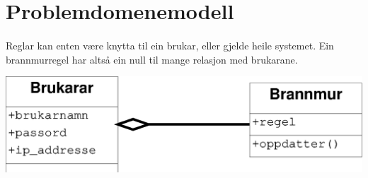 \documentclass[nynorsk,12pt,a4paper]{article}
\begin{document}
\newpage
\section{Problemdomenemodell}
\paragraph{}
Reglar kan enten være knytta til ein brukar, eller gjelde heile systemet. Ein brannmurregel har altså ein null til mange relasjon med brukarane.

\includegraphics[scale=0.5]{gfx/dm1.eps}
\end{document}
